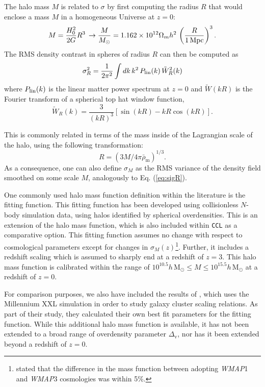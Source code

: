 \documentclass[\docopts]{\docclass}
\newcommand{\ccl}{{\tt CCL}\xspace}
\begin{document}
The halo mass $M$ is related to $\sigma$ by first computing the radius $R$ that would enclose a mass $M$ in a homogeneous Universe at $z=0$:
\begin{equation}
  M=\frac{H_0^2}{2G}R^3\,\rightarrow \frac{M}{M_\odot}=1.162\times10^{12}\Omega_mh^2\,\left(\frac{R}{1\,{\rm Mpc}}\right)^3.
\end{equation}
The RMS density contrast in spheres of radius $R$ can then be computed as
\begin{equation}
  \sigma_R^2 = \frac{1}{2\pi^2}\int dk\,k^2\,P_{\rm lin}(k)\,\tilde{W}_R^2(k)
  \label{eq:sigR}
\end{equation}
where $P_{\rm lin}(k)$ is the linear matter power spectrum at $z=0$ and $\tilde{W}(kR)$ is the Fourier transform of a spherical top hat window function,
\begin{equation}
\tilde{W}_R(k) = \frac{3}{(kR)^3}[\sin(kR)-kR\cos(kR)].
\end{equation}

This is commonly related in terms of the mass inside of the Lagrangian scale of the halo, using the following transformation:
\begin{equation}
R = (3M/4\pi{\bar\rho_{\mathrm{m}}})^{1/3}.
\label{eq:lagrangemass}
\end{equation}
As a consequence, one can also define $\sigma_M$ as the RMS variance of the density field smoothed on some scale $M$, analogously to Eq. (\ref{eq:sigR}).

One commonly used halo mass function definition within the literature is the \citet{Tinker2010} fitting function. This fitting function has been developed using collisionless $N$-body simulation data, using halos identified by spherical overdensities. This is an extension of the \citet{Tinker2008} halo mass function, which is also included within \ccl as a comparative option. This fitting function assumes no change with respect to cosmological parameters except for changes in $\sigma_M(z)$\footnote{\citet{Tinker2008} stated that the difference in the mass function between adopting {\it WMAP}1 and {\it WMAP}3 cosmologies was within 5\%.}. Further, it includes a redshift scaling which is assumed to sharply end at a redshift of $z = 3$. This halo mass function is calibrated within the range of $10^{10.5} h\,\mathrm{M}_\odot \leq M \leq 10^{15.5} h\,\mathrm{M}_\odot$ at a redshift of $z = 0$.

For comparison purposes, we also have included the results of \citet{Angulo2012}, which uses the Millennium XXL simulation in order to study galaxy cluster scaling relations. As part of their study, they calculated their own best fit parameters for the \citet{Tinker2010} fitting function. While this additional halo mass function is available, it has not been extended to a broad range of overdensity parameter $\Delta_\mathrm{v}$, nor has it been extended beyond a redshift of $z = 0$.
\end{document}
